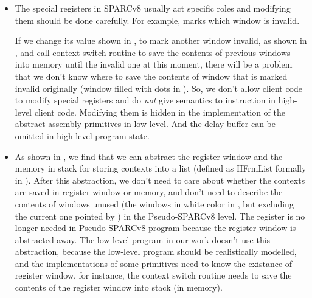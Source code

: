 \begin{itemize}
    \item 
    The special registers in SPARCv8 usually act specific 
    roles and modifying them should be done carefully. 
    For example, \regwim{} marks which window is invalid.
    \begin{center}
        \vspace*{-0.5em}
        
        \vspace*{-0.5em}
        \label{fig:problem of modifying wim arbitrary}
    \end{center}
    If we change its value shown in 
    \Fig{\ref{fig:Abstraction of Register Windows and Memory}}, 
    to mark another window invalid, as shown in 
    \Fig{\ref{fig:problem of modifying wim arbitrary}}, 
    and call context switch routine to  
    save the contents of previous windows into memory
    until the invalid one at this moment,  
    there will be a problem that we don't know 
    where to save the contents of window that 
    is marked invalid originally 
    (window filled with dots in \Fig{\ref{fig:problem of modifying wim arbitrary}}). 
    So, we don't allow client code 
    to modify special registers and do \textit{not} 
    give semantics to \cwr{} instruction in high-level 
    client code. Modifying them is hidden in the 
    implementation of the abstract assembly primitives
    in low-level. 
    And the delay buffer can be omitted in high-level
    program state. 
    \item 
    As shown in \Fig{\ref{fig:Abstraction of Register Windows and Memory}}, 
    we find that we can abstract the register window 
    and the memory in stack for storing contexts 
    into a list (defined as 
    HFrmList formally in \Fig{\ref{fig:machine-state-concur-pseudo-sparc}}).  
    After this abstraction, we don't need to care about 
    whether the contexts are saved in register window or 
    memory, and don't need to describe the contents of windows unused 
    (the windows in white color in 
    \Fig{\ref{fig:Abstraction of Register Windows and Memory}}, 
    but excluding the current one pointed by \regcwp{}) 
    in the Pseudo-SPARCv8 level. 
    The \regcwp{} register is no longer needed in 
    Pseudo-SPARCv8 program because the register window 
    is abstracted away. 
    The low-level program in our work doesn't use this 
    abstraction, because the low-level program 
    should be realistically modelled, 
    and the implementations of some primitives 
    need to know the existance of register window,  
    for instance, the context switch routine 
    needs to save the contents 
    of the register window into stack (in memory).
\end{itemize}

